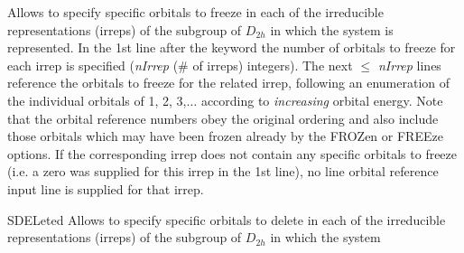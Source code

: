 \begin{keywordlist}
Allows to specify specific orbitals to freeze in each of the irreducible
representations (irreps) of the subgroup of $D_{2h}$ in which the system
is represented. In the 1st line after the keyword the number of orbitals
to freeze for each irrep is specified ({\it nIrrep} (\# of irreps) integers).
The next {\it $\leq$ nIrrep} lines reference the orbitals to freeze for the
related irrep, following an enumeration of the individual orbitals
of 1, 2, 3,$\ldots$ according to
{\it increasing} orbital energy. Note that the orbital reference numbers
obey the original ordering and also include those orbitals which
may have been frozen already by the
{\keyfont FROZen} or {\keyfont FREEze} options. If the corresponding irrep does not contain any
specific orbitals to freeze (i.e. a zero was supplied for this irrep in the
1st line), no line orbital reference input line is supplied for that irrep.
\item[SDELeted]
Allows to specify specific orbitals to delete in each of the irreducible
representations (irreps) of the subgroup of $D_{2h}$ in which the system

\end{keywordlist}
